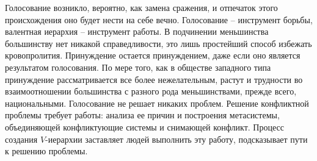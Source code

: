 \documentclass{book}
\begin{document}
Голосование возникло, вероятно, как замена сражения, и от­печаток этого происхождения оно будет нести на себе вечно. Голосование -- инструмент борьбы, валентная иерархия -- инст­румент работы. В подчинении меньшинства большинству нет ни­какой справедливости, это лишь простейший способ избежать кровопролития. Принуждение остается принуждением, даже ес­ли оно является результатом голосования. По мере того, как в обществе западного типа принуждение рассматривается все более нежелательным, растут и трудности во взаимоотношении большинства с разного рода меньшинствами, прежде всего, национальными. Голосование не решает никаких проблем. Решение конфликтной проблемы требует работы: анализа ее причин и по­строения метасистемы, объединяющей конфликтующие системы и снимающей конфликт. Процесс создания $V$-иерархии заставля­ет людей выполнить эту работу, подсказывает пути к решению проблемы.
\end{document}
